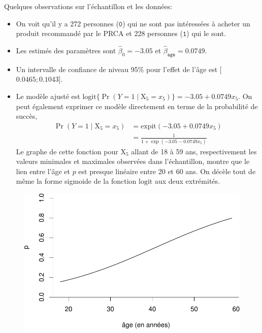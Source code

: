 \documentclass[
  11pt,
  letterpaper,
]{book}
\providecommand{\tightlist}{%
  \setlength{\itemsep}{0pt}\setlength{\parskip}{0pt}}\usepackage{longtable,booktabs,array}
\theoremstyle{definition}
\theoremstyle{remark}
\begin{document}
Quelques observations sur l'échantillon et les données:

\begin{itemize}
\tightlist
\item
  On voit qu'il y a 272 personnes (\(\texttt{0}\)) qui ne sont pas
  intéressées à acheter un produit recommandé par le PRCA et 228
  personnes (\(\texttt{1}\)) qui le sont.
\item
  Les estimés des paramètres sont \(\widehat{\beta}_0 = -3.05\) et
  \(\widehat{\beta}_{\texttt{age}}=0.0749\).
\item
  Un intervalle de confiance de niveau 95\% pour l'effet de l'âge est
  {[}\(0.0465; 0.1043\){]}.
\item
  Le modèle ajusté est
  \(\textrm{logit}\{\Pr(Y=1 \mid \mathrm{X}_5=x_5)\} = -3.05 + 0.0749 x_5\).
  On peut également exprimer ce modèle directement en terme de la
  probabilité de succès, \begin{align*}
  \Pr(Y=1 \mid \mathrm{X}_5=x_5) &= \textrm{expit}(-3.05 + 0.0749 x_5) \\&= \frac{1}{1+\exp(-3.05 - 0.0749 x_5)}
  \end{align*} Le graphe de cette fonction pour \(\mathrm{X}_5\) allant
  de 18 à 59 ans, respectivement les valeurs minimales et maximales
  observées dans l'échantillon, montre que le lien entre l'âge et \(p\)
  est presque linéaire entre 20 et 60 ans. On décèle tout de même la
  forme sigmoide de la fonction \(\textrm{logit}\) aux deux extrémités.
\end{itemize}

\begin{figure}[ht!]

{\centering \includegraphics[width=1\textwidth,height=\textheight]{./05-reglogistique_files/figure-pdf/logitplot2-1.pdf}

}

\end{figure}
\end{document}
